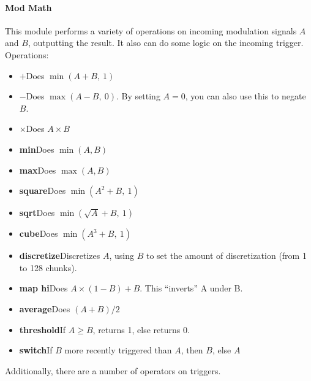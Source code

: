 \documentclass{article}
\begin{document}
\paragraph{Mod Math}  This module performs a variety of operations on incoming modulation signals \(A\) and \(B\), outputting the result.  It also can do some logic on the incoming trigger.  Operations:

\begin{itemize}
\item \(\boldsymbol{+}\)\quad Does \(\min(A + B,\ 1)\)
\item \(\boldsymbol -\)\quad Does \(\max(A - B,\ 0)\).  By setting \(A=0\), you can also use this to negate \(B\).
\item \(\boldsymbol \times\)\quad Does \(A \times B\)
\item {\bf min}\quad Does \(\min(A, B)\)
\item {\bf max}\quad Does \(\max(A, B)\)
\item {\bf square}\quad Does \(\min(A^2 + B,\ 1)\)
\item {\bf sqrt}\quad Does \(\min(\sqrt{A} + B,\ 1)\)
\item {\bf cube}\quad Does \(\min(A^3 + B,\ 1)\)
\item {\bf discretize}\quad Discretizes \(A\), using \(B\) to set the amount of discretization (from 1 to 128 chunks).
\item {\bf map hi}\quad Does \(A \times (1-B) + B\).  This ``inverts'' A under B.
\item {\bf average}\quad Does \((A + B) / 2\)
\item {\bf threshold}\quad If \(A \geq B\), returns 1, else returns 0.
\item {\bf switch}\quad If \(B\) more recently triggered than \(A\), then \(B\), else \(A\)
\end{itemize}

\noindent Additionally, there are a number of operators on triggers.
\end{document}
